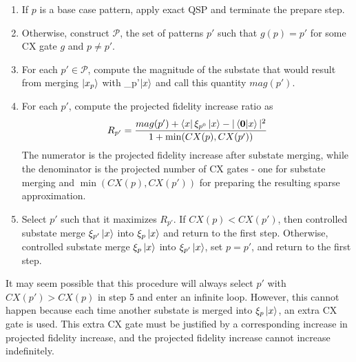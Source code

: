 \begin{enumerate}
  \item If $p$ is a base case pattern, apply exact QSP and terminate the 
    prepare step.
  \item Otherwise, construct $\mathcal{P}$, the set of patterns $p'$ such that $g(p) = p'$ for
    some CX gate $g$ and $p \neq p'$.
  \item For each $p' \in \mathcal{P}$, compute the magnitude of the substate that would result
    from merging $\mathinner{|{x_p}\rangle}$ with \xi_{p'}$\mathinner{|{x}\rangle}$ and call this quantity $mag(p')$.
  \item For each $p'$, compute the projected fidelity increase ratio as
    \begin{equation}
      R_{p'} = \frac{mag(p') + \mathinner{\langle{x}|}\xi_{p^0}\mathinner{|{x}\rangle} - |\mathinner{\langle{\mathbf{0}|x}\rangle}|^2}
      {1 + \min(CX(p), CX(p'))}
    \end{equation}
    The numerator is the projected fidelity increase after substate merging, while
    the denominator is the projected number of CX gates - one for substate merging
    and $\min(CX(p), CX(p'))$ for preparing the resulting sparse approximation.
  \item Select $p'$ such that it maximizes $R_{p'}$. If 
    $CX(p) < CX(p')$, then controlled substate merge
    $\xi_{p'}\mathinner{|{x}\rangle}$ into $\xi_{p}\mathinner{|{x}\rangle}$ and return to the first step. 
    Otherwise, controlled substate merge $\xi_p\mathinner{|{x}\rangle}$ into $\xi_{p'}\mathinner{|{x}\rangle}$, set 
    $p = p'$, and return to the first step.
\end{enumerate}
It may seem possible that this procedure will always select $p'$ with
$CX(p') > CX(p)$ in step 5 and enter an infinite loop. However,
this cannot happen because each time another substate is merged into $\xi_p\mathinner{|{x}\rangle}$, an
extra CX gate is used. This extra CX gate must be justified by a corresponding
increase in projected fidelity increase, and the projected fidelity increase cannot
increase indefinitely.



